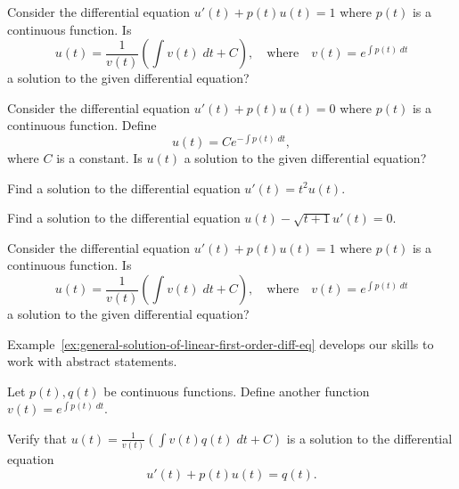\documentclass[../main.tex]{subfiles}
\begin{document}
\begin{example}
  Consider the differential equation \( u'(t) + p(t) u(t) = 1 \) where \(p(t)\) is a continuous function. Is
  \[
    u(t) = \frac{1}{v(t)} \left( \int v(t) \;dt + C \right), \quad\text{where}\quad v(t) = e^{\int p(t)\;dt}
  \]
  a solution to the given differential equation?
  \clearpage
\end{example}

\begin{example}
  Consider the differential equation \( u'(t) + p(t) u(t) = 0\) where \(p(t)\) is a continuous function. Define
  \[
    u(t) = C e^{-\int p(t) \;dt},
  \]
  where \(C\) is a constant. Is \(u(t)\) a solution to the given differential equation?
\end{example}

\begin{example}
  Find a solution to the differential equation \(u'(t) = t^{2} u(t)\).
\end{example}

\begin{example}
  Find a solution to the differential equation \(u(t) - \sqrt{t+1} u'(t) = 0\).
\end{example}

\begin{example}
  Consider the differential equation \( u'(t) + p(t) u(t) = 1 \) where \(p(t)\) is a continuous function. Is
  \[
    u(t) = \frac{1}{v(t)} \left( \int v(t) \;dt + C \right), \quad\text{where}\quad v(t) = e^{\int p(t)\;dt}
  \]
  a solution to the given differential equation?
\end{example}

\clearpage

Example~\ref{ex:general-solution-of-linear-first-order-diff-eq} develops our skills to work with abstract statements. 

\begin{example} \label{ex:general-solution-of-linear-first-order-diff-eq}
  Let \(p(t), q(t)\) be continuous functions.  Define another function \(v(t) = e^{\int p(t) \;dt}\). 

  Verify that \(u(t) = \frac{1}{v(t)} \left( \int v(t) q(t) \;dt + C \right)\) is a solution to the differential equation
  \[
    u'(t) + p(t) u(t) = q(t).
  \]

  \clearpage
\end{example}
\end{document}
